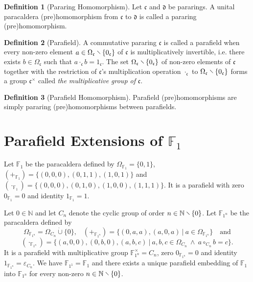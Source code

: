 \documentclass{article}
\theoremstyle{definition}
\newtheorem{definition}{Definition}[section]
\newcommand{\conj}{~\land~}
\newcommand{\diff}{\mathbin{\hspace{-.2em}\raisebox{.06em}{\rotatebox[origin=c]{-45}{$-$}\hspace{-.24em}}}}
\newcommand{\eps}{\varepsilon}
\begin{document}

\begin{definition}[Pararing Homomorphism]
Let \(\mathfrak{c}\) and \(\mathfrak{d}\) be pararings. A unital paracaldera (pre)homomorphism from \(\mathfrak{c}\) to \(\mathfrak{d}\) is called a pararing (pre)homomorphism.
\end{definition}

\begin{definition}[Parafield]
A commutative pararing \(\mathfrak{c}\) is called a parafield when every non-zero element \(a\in\Omega_\mathfrak{c}\diff\{0_\mathfrak{c}\}\) of \(\mathfrak{c}\) is multiplicatively invertible, i.e. there exists \(b\in\Omega_\mathfrak{c}\) such that \(a\cdot_\mathfrak{c}b=1_\mathfrak{c}\). The set \(\Omega_\mathfrak{c}\diff\{0_\mathfrak{c}\}\) of non-zero elements of \(\mathfrak{c}\) together with the restriction of \(\mathfrak{c}\)'s multiplication operation \(\cdot_\mathfrak{c}\) to \(\Omega_\mathfrak{c}\diff\{0_\mathfrak{c}\}\) forms a group \(\mathfrak{c}^\times\) called \textit{the multiplicative group of} \(\mathfrak{c}\).
\end{definition}

\begin{definition}[Parafield Homomorphism]
Parafield (pre)homomorphisms are simply pararing (pre)homomorphisms between parafields.
\end{definition}

\section{Parafield Extensions of \texorpdfstring{\(\mathbb{F}_1\)}{F1}}

Let \(\mathbb{F}_1\) be the paracaldera defined by \(\Omega_{\mathbb{F}_1}=\{0,1\}\), \((+_{\mathbb{F}_1})=\{(0,0,0),(0,1,1),(1,0,1)\}\) and \((\cdot_{\mathbb{F}_1})=\{(0,0,0),(0,1,0),(1,0,0),(1,1,1)\}\). It is a parafield with zero
\(0_{\mathbb{F}_1}=0\) and identity \(1_{\mathbb{F}_1}=1\).

Let \(0\in\mathbb{N}\) and let \(C_n\) denote the cyclic group of order \(n\in\mathbb{N}\diff\{0\}\). Let \(\mathbb{F}_{1^n}\) be the paracaldera defined by \[\Omega_{\mathbb{F}_{1^n}}=\Omega_{C_n}\mathbin{\dot\cup}\{0\}\text{,}\quad(+_{\mathbb{F}_{1^n}})=\{(0,a,a),(a,0,a)~|~a\in\Omega_{\mathbb{F}_{1^n}}\}\quad\text{and}\]\[(\cdot_{\mathbb{F}_{1^n}})=\{(a,0,0),(0,b,0),(a,b,c)~|~a,b,c\in\Omega_{C_n}\conj a\circ_{C_n}b=c\}\text{.}\] It is a parafield with multiplicative group \(\mathbb{F}_{1^n}^\times=C_n\), zero \(0_{\mathbb{F}_{1^n}}=0\) and identity \(1_{\mathbb{F}_{1^n}}=\eps_{C_n}\). We have \(\mathbb{F}_{1^1}=\mathbb{F}_1\) and there exists a unique parafield embedding of \(\mathbb{F}_{1}\) into \(\mathbb{F}_{1^n}\) for every non-zero \(n\in\mathbb{N}\diff\{0\}\).
\end{document}
